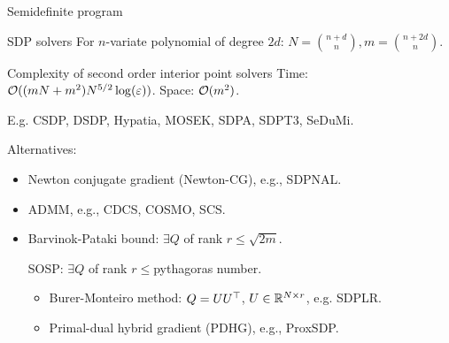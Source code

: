 \begin{frame}{Semidefinite program}
\end{frame}

\begin{frame}{SDP solvers}
  For $n$-variate polynomial of degree $2d$:
  $N = {n + d \choose n}, m = {n + 2d \choose n}$.

  \begin{block}{Complexity of second order interior point solvers}
    Time:
    $\mathcal{O}((mN + m^2)N^{5/2}\log(\varepsilon))$.
    Space:
    $\mathcal{O}(m^2)$.

    E.g. CSDP, DSDP, Hypatia, MOSEK, SDPA, SDPT3, SeDuMi.
  \end{block}

  \vspace{-1em}

  Alternatives:

  \vspace{-1em}

  \begin{itemize}
    \item
    Newton conjugate gradient (Newton-CG), e.g., SDPNAL.
    \item
    ADMM, e.g., CDCS, COSMO, SCS.
    \item
    Barvinok-Pataki bound: $\exists Q$ of rank $r \le \sqrt{2m}$.

    SOSP: $\exists Q$ of rank $r \le {}$pythagoras number.
  \begin{itemize}
    \item
    Burer-Monteiro method: $Q = UU^\top$, $U \in \mathbb{R}^{N \times r}$, e.g. SDPLR.
    \item
    Primal-dual hybrid gradient (PDHG), e.g., ProxSDP.
  \end{itemize}
  \end{itemize}
\end{frame}

